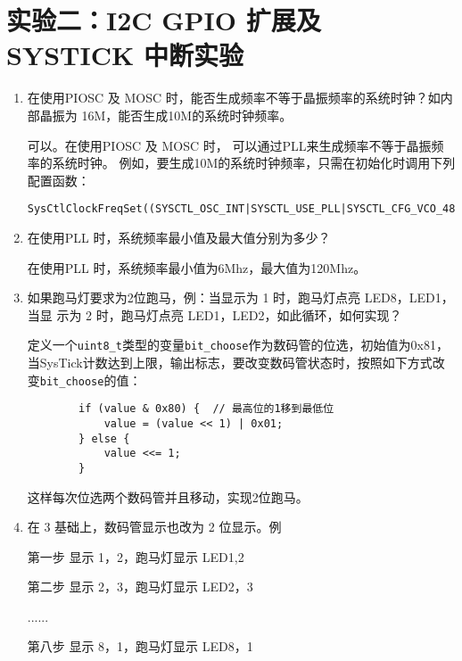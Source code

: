 \documentclass[12pt, a4paper, oneside]{ctexart}
\begin{document}
    \section{实验二：I2C GPIO 扩展及 SYSTICK 中断实验}
    \begin{enumerate}[listparindent=2em]
        \item  在使用PIOSC 及 MOSC 时，能否生成频率不等于晶振频率的系统时钟？如内部晶振为
        16M，能否生成10M的系统时钟频率。

        {\kaishu 可以。在使用PIOSC 及 MOSC 时，
        可以通过PLL来生成频率不等于晶振频率的系统时钟。
        例如，要生成10M的系统时钟频率，只需在初始化时调用下列配置函数：
        \begin{lstlisting}
SysCtlClockFreqSet((SYSCTL_OSC_INT|SYSCTL_USE_PLL|SYSCTL_CFG_VCO_480),10000000);
        \end{lstlisting}
        }

        \item 在使用PLL 时，系统频率最小值及最大值分别为多少？
        
        {\kaishu 在使用PLL 时，系统频率最小值为6Mhz，最大值为120Mhz。}
        
        \item 如果跑马灯要求为2位跑马，例：当显示为 1 时，跑马灯点亮 LED8，LED1，当显
        示为 2 时，跑马灯点亮 LED1，LED2，如此循环，如何实现？

        {\kaishu 定义一个\verb|uint8_t|类型的变量\verb|bit_choose|作为数码管的位选，初始值为0x81，
        当SysTick计数达到上限，输出标志，要改变数码管状态时，按照如下方式改变\verb|bit_choose|的值：}

        \begin{lstlisting}
        if (value & 0x80) {  // 最高位的1移到最低位
            value = (value << 1) | 0x01;  
        } else {
            value <<= 1; 
        }
        \end{lstlisting}

        {这样每次位选两个数码管并且移动，实现2位跑马。}

        \item 在 3 基础上，数码管显示也改为 2 位显示。例
        
        第一步 显示 1，2，跑马灯显示 LED1,2
        
        第二步 显示 2，3，跑马灯显示 LED2，3
        
        ......
        
        第八步 显示 8，1，跑马灯显示 LED8，1
        

\end{enumerate}
\end{document}

